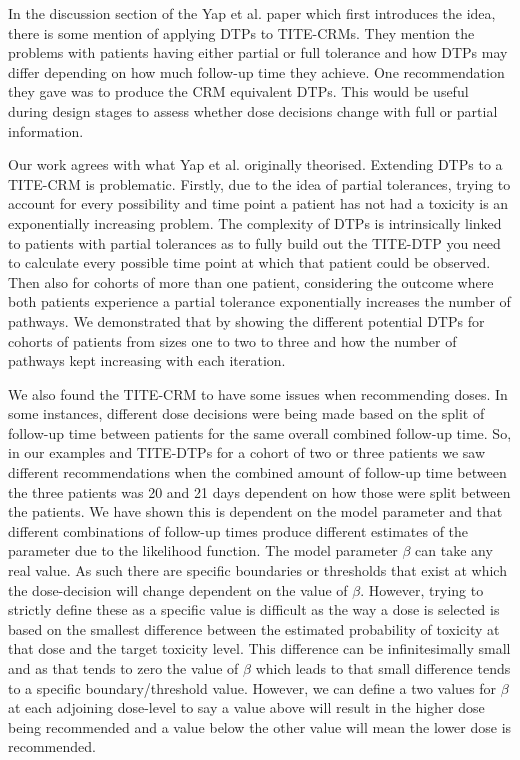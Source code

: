 In the discussion section of the Yap et al. \cite{yapDoseTransitionPathways2017} paper which first introduces the idea, there is some mention of applying DTPs to TITE-CRMs. They mention the problems with patients having either partial or full tolerance and how DTPs may differ depending on how much follow-up time they achieve. One recommendation they gave was to produce the CRM equivalent DTPs. This would be useful during design stages to assess whether dose decisions change with full or partial information. 

Our work agrees with what Yap et al. \cite{yapDoseTransitionPathways2017} originally theorised. Extending DTPs to a TITE-CRM is problematic. Firstly, due to the idea of partial tolerances, trying to account for every possibility and time point a patient has not had a toxicity is an exponentially increasing problem. The complexity of DTPs is intrinsically linked to patients with partial tolerances as to fully build out the TITE-DTP you need to calculate every possible time point at which that patient could be observed. Then also for cohorts of more than one patient, considering the outcome where both patients experience a partial tolerance exponentially increases the number of pathways. We demonstrated that by showing the different potential DTPs for cohorts of patients from sizes one to two to three and how the number of pathways kept increasing with each iteration. 

We also found the TITE-CRM to have some issues when recommending doses. In some instances, different dose decisions were being made based on the split of follow-up time between patients for the same overall combined follow-up time. So, in our examples and TITE-DTPs for a cohort of two or three patients we saw different recommendations when the combined amount of follow-up time between the three patients was 20 and 21 days dependent on how those were split between the patients. We have shown this is dependent on the model parameter and that different combinations of follow-up times produce different estimates of the parameter due to the likelihood function. The model parameter $\beta$ can take any real value. As such there are specific boundaries or thresholds that exist at which the dose-decision will change dependent on the value of $\beta$. However, trying to strictly define these as a specific value is difficult as the way a dose is selected is based on the smallest difference between the estimated probability of toxicity at that dose and the target toxicity level. This difference can be infinitesimally small and as that tends to zero the value of $\beta$ which leads to that small difference tends to a specific boundary/threshold value. However, we can define a two values for $\beta$ at each adjoining dose-level to say a value above will result in the higher dose being recommended and a value below the other value will mean the lower dose is recommended.

